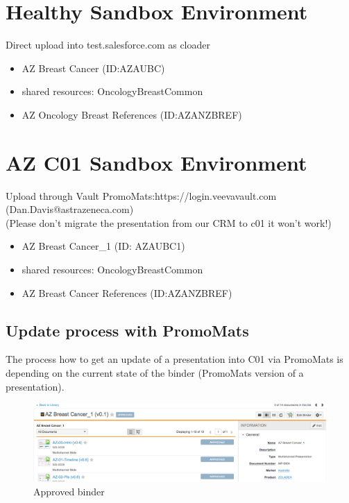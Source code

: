 \newcommand{\qq}{\symbol{34}} %
\newcommand{\FormatApiMethod}[1]{\bfseries{#1}}
\newcommand*{\FormatCell}[1]{\textcolor{lightgrey}{\MakeUppercase{#1}}}
\section{Healthy Sandbox Environment} 
Direct upload into test.salesforce.com as cloader

\begin{itemize}
\item AZ Breast Cancer (ID:AZAUBC)
\item shared resources: OncologyBreastCommon
\item AZ Oncology Breast References (ID:AZANZBREF)
\end{itemize}

\section{AZ C01 Sandbox Environment}
Upload through Vault PromoMats:https://login.veevavault.com (Dan.Davis@astrazeneca.com)\\
(Please don't migrate the presentation from our CRM to c01 it won't work!)

\begin{itemize}
\item AZ Breast Cancer\_1 (ID: AZAUBC1)
\item shared resources: OncologyBreastCommon
\item AZ Breast Cancer References (ID:AZANZBREF)

\end{itemize}

\subsection{Update process with PromoMats}
The process how to get an update of a presentation into C01 via PromoMats is depending on the current state of the binder (PromoMats version of a presentation).

\begin{center}
\begin{figure}[!h]
\centering\includegraphics[width=\textwidth]{images/approved.png} 
\caption{Approved binder} \label{fig:approved}
\end{figure}
\end{center}
 

